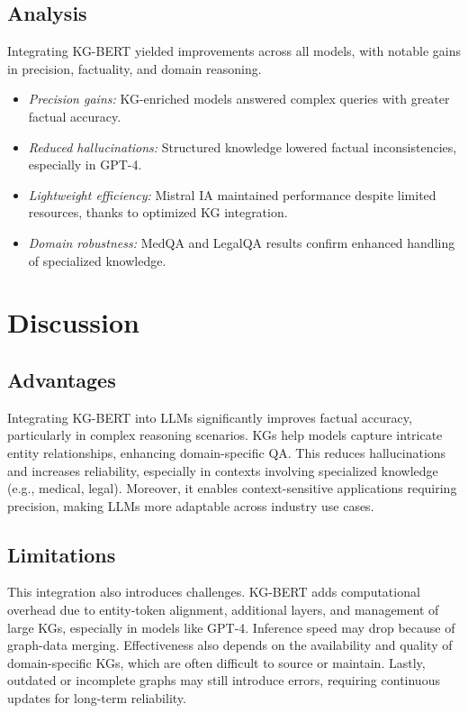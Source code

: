 \documentclass[conference]{IEEEtran}
\begin{document}
\subsection{Analysis}

Integrating KG-BERT yielded improvements across all models, with notable gains in precision, factuality, and domain reasoning.
\begin{itemize}
    \item \textit{Precision gains:} KG-enriched models answered complex queries with greater factual accuracy.
    \item \textit{Reduced hallucinations:} Structured knowledge lowered factual inconsistencies, especially in GPT-4.
    \item \textit{Lightweight efficiency:} Mistral IA maintained performance despite limited resources, thanks to optimized KG integration.
    \item \textit{Domain robustness:} MedQA and LegalQA results confirm enhanced handling of specialized knowledge.
\end{itemize}



\section{Discussion}
\label{sec:DISC}

\subsection{Advantages}
Integrating KG-BERT into LLMs significantly improves factual accuracy, particularly in complex reasoning scenarios. KGs help models capture intricate entity relationships, enhancing domain-specific QA. This reduces hallucinations and increases reliability, especially in contexts involving specialized knowledge (e.g., medical, legal). Moreover, it enables context-sensitive applications requiring precision, making LLMs more adaptable across industry use cases.

\subsection{Limitations}
This integration also introduces challenges. KG-BERT adds computational overhead due to entity-token alignment, additional layers, and management of large KGs, especially in models like GPT-4. Inference speed may drop because of graph-data merging. Effectiveness also depends on the availability and quality of domain-specific KGs, which are often difficult to source or maintain. Lastly, outdated or incomplete graphs may still introduce errors, requiring continuous updates for long-term reliability.
\end{document}
